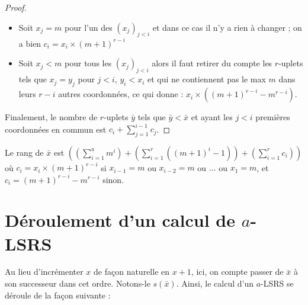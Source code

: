 \documentclass{report}
\begin{document}
\begin{proof}
			\begin{itemize}[itemsep=-1mm]
				\item	Soit $x_j = m$ pour l'un des $\left(x_j\right)_{j < i}$ et dans ce cas il n'y a rien à changer ; on a bien $c_i = x_i \times \left(m+1\right)^{r-i}$
				\item 	Soit $x_j < m$ pour tous les $\left(x_j\right)_{j < i}$ alors il faut retirer du compte les $r$-uplets tels que $x_j = y_j$ pour $j < i$, $y_i < x_i$ et qui ne contiennent pas le max $m$ dans leurs $r-i$ autres coordonnées, ce qui donne : $x_i \times \left(\left(m+1\right)^{r-i} - m^{r-i}\right)$.
			\end{itemize}
			
			Finalement, le nombre de $r$-uplets $\bar{y}$ tels que $\bar{y} < \bar{x}$ et ayant les $j<i$ premières coordonnées en commun est $c_i + \sum_{j=1}^{i-1} c_j$.
		\end{proof}
		
		\begin{coro}
			\label{coro:rang_bon_ordre}
			Le rang de $\bar{x}$ est $\left( \left( \sum_{i=1}^{a} m^i \right) + \left( \sum_{i=1}^{r} \left( \left(m+1\right)^i -1 \right) \right) + \left(\sum_{i=1}^{r} c_i \right) \right)$ où $c_i = x_i \times \left(m+1\right)^{r-i}$ si $x_{i-1} = m$ ou $x_{i-2} = m$ ou $\dots$ ou $x_{1} = m$, et $c_i = \left(m+1\right)^{r-i}-m^{r-i}$ sinon. 
		\end{coro}
		
		
	
	\section{Déroulement d'un calcul de $a$-LSRS}
	\label{par:deroulement_aLSRS}
	Au lieu d'incrémenter $x$ de façon naturelle en $x+1$, ici, on compte passer de $\bar{x}$ à son successeur dans cet ordre. Notons-le $s\left(\bar{x}\right)$. Ainsi, le calcul d'un $a$-LSRS se déroule de la façon suivante :
	
\end{document}
